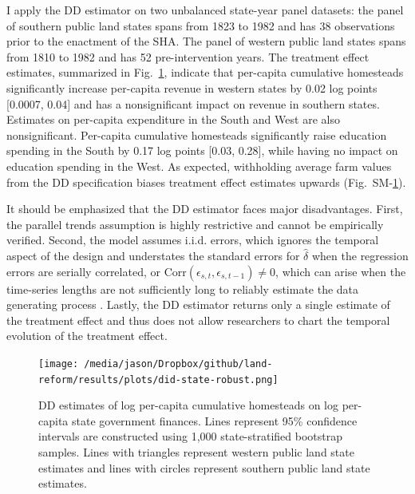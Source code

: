 \documentclass[12pt]{article}
\begin{document}
I apply the DD estimator on two unbalanced state-year panel datasets: the panel of southern public land states spans  from 1823 to 1982 and has 38 observations prior to the enactment of the SHA. The panel of western public land states spans from 1810 to 1982 and has 52 pre-intervention years. The treatment effect estimates, summarized in Fig.~\ref{fig:did-state-robust}, indicate that per-capita cumulative homesteads significantly increase per-capita revenue in western states by 0.02 log points [0.0007, 0.04] and has a nonsignificant impact on revenue in southern states. Estimates on per-capita expenditure in the South and West are also nonsignificant. Per-capita cumulative homesteads significantly raise education spending in the South by 0.17 log points [0.03, 0.28], while having no impact on education spending in the West. As expected, withholding average farm values from the DD specification biases treatment effect estimates upwards (Fig.~SM-\ref{fig:did-state-robust}).

It should be emphasized that the DD estimator faces major disadvantages. First, the parallel trends assumption is highly restrictive and cannot be empirically verified. Second, the model assumes i.i.d. errors, which ignores the temporal aspect of the design and understates the standard errors for $\hat{\delta}$ when the regression errors are serially correlated, or $\mathrm{Corr} (\epsilon_{s, t}, \epsilon_{s, t-1}) \neq 0$, which can arise when the time-series lengths are not sufficiently long to reliably estimate the data generating process \citep{bertrand2004much}. Lastly, the DD estimator returns only a single estimate of the treatment effect and thus does not allow researchers to chart the temporal evolution of the treatment effect. 

\begin{figure}[htbp]
	\begin{center}
		\texttt{[image: /media/jason/Dropbox/github/land-reform/results/plots/did-state-robust.png]}
	\end{center}
	\caption{DD estimates of log per-capita cumulative homesteads on log per-capita state government finances. Lines represent 95\% confidence intervals are constructed using 1,000 state-stratified bootstrap samples. Lines with triangles represent western public land state estimates and lines with circles represent southern public land state estimates.  \label{fig:did-state-robust}}
\end{figure}

%
\end{document}
